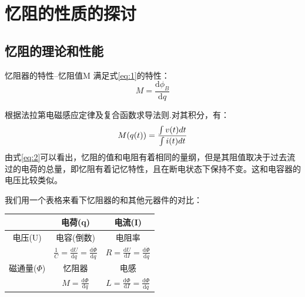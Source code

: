 \documentclass[UTF8]{article}
\begin{document}
\section{忆阻的性质的探讨}

\subsection{忆阻的理论和性能}

忆阻器的特性--忆阻值M 满足式\eqref{eq:1}的特性：
\begin{equation}\label{eq:1}
M = \frac{\mathrm d\phi_{B}}{\mathrm dq}
\end{equation}

根据法拉第电磁感应定律及复合函数求导法则.对其积分，有：
\begin{equation}\label{eq:2}
M(q(t)) = \frac{\int\mathnormal{v(t)dt}}{\int\mathnormal{i(t)dt}}
\end{equation}
由式\eqref{eq:2}可以看出，忆阻的值和电阻有着相同的量纲，但是其阻值取决于过去流过的电荷的总量，即忆阻有着记忆特性，且在断电状态下保持不变。这和电容器的电压比较类似。

我们用一个表格来看下忆阻器的和其他元器件的对比：

\begin{tabular}{|c|c|c|}

\hline
& 电荷(q)& 电流(I) \\

 \hline
电压(U)  & 电容(倒数) &电阻率 \\
     & $\frac{1}{C}=\frac{\mathrm{d}U}{\mathrm{d}q}=\frac{\mathrm{d}\dot \Phi}{\mathrm{d}q}$  &   $R=\frac{\mathrm{d}U}{\mathrm{d}I}=\frac{\mathrm{d}\dot \Phi}{\mathrm{d}\dot{q}}$ \\
 \hline
磁通量($\Phi$)  & 忆阻器 & 电感 \\
     & $M=\frac{\mathrm{d}\Phi}{\mathrm{d}q}$  &  $L=\frac{\mathrm{d}\Phi}{\mathrm{d}I}=\frac{\mathrm{d}\Phi}{\mathrm{d}\dot{q}}$ \\
 \hline
\end{tabular}
\end{document}
